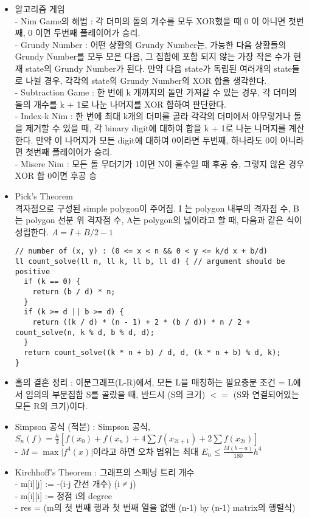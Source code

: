 \documentclass[landscape, 8pt, a4paper, oneside]{extarticle} %
\begin{document}
\begin{multicols*}{3}
\begin{itemize}
\item 알고리즘 게임\\
- Nim Game의 해법 : 각 더미의 돌의 개수를 모두 XOR했을 때 0 이 아니면 첫번째, 0 이면 두번째 플레이어가 승리.\\
- Grundy Number : 어떤 상황의 Grundy Number는, 가능한 다음 상황들의 Grundy Number를 모두 모은 다음, 그 집합에 포함 되지 않는 가장 작은 수가 현재 state의 Grundy Number가 된다. 만약 다음 state가 독립된 여러개의 state들로 나뉠 경우, 각각의 state의 Grundy Number의 XOR 합을 생각한다.\\
- Subtraction Game : 한 번에 k 개까지의 돌만 가져갈 수 있는 경우, 각 더미의 돌의 개수를 k + 1로 나눈 나머지를 XOR 합하여 판단한다.\\
- Index-k Nim : 한 번에 최대 k개의 더미를 골라 각각의 더미에서 아무렇게나 돌을 제거할 수 있을 때, 각 binary digit에 대하여 합을 k + 1로 나눈 나머지를 계산한다. 만약 이 나머지가 모든 digit에 대하여 0이라면 두번째, 하나라도 0이 아니라면 첫번째 플레이어가 승리.\\
- Misere Nim : 모든 돌 무더기가 1이면 N이 홀수일 때 후공 승, 그렇지 않은 경우 XOR 합 0이면 후공 승

\item Pick’s Theorem\\
격자점으로 구성된 simple polygon이 주어짐. I 는 polygon 내부의 격자점 수, B 는 polygon 선분 위 격자점 수, A는 polygon의 넓이라고 할 때, 다음과 같은 식이 성립한다. $A=I+B/2-1$
\begin{verbatim}
// number of (x, y) : (0 <= x < n && 0 < y <= k/d x + b/d)
ll count_solve(ll n, ll k, ll b, ll d) { // argument should be positive
  if (k == 0) {
    return (b / d) * n;
  }
  if (k >= d || b >= d) {
    return ((k / d) * (n - 1) + 2 * (b / d)) * n / 2 + count_solve(n, k % d, b % d, d);
  }
  return count_solve((k * n + b) / d, d, (k * n + b) % d, k);
}
\end{verbatim}

\item 홀의 결혼 정리 : 이분그래프(L-R)에서, 모든 L을 매칭하는 필요충분 조건 = L에서 임의의 부분집합 S를 골랐을 때, 반드시 (S의 크기) $<=$ (S와 연결되어있는 모든 R의 크기)이다.

\item Simpson 공식 (적분) : Simpson 공식, $S_n(f) = \frac{h}{3}[f(x_0)+f(x_n)+ 4\sum f(x_{2i+1}) + 2\sum f(x_{2i})]$\\
- $M = \max \vert f^4(x) \vert$이라고 하면 오차 범위는 최대 $E_n \leq \frac{M(b-a)}{180}h^4$

\item Kirchhoff’s Theorem : 그래프의 스패닝 트리 개수\\
- m[i][j] :=  -(i-j 간선 개수) (i ≠ j)\\
- m[i][i] :=  정점 i의 degree\\
- res =  (m의 첫 번째 행과 첫 번째 열을 없앤 (n-1) by (n-1) matrix의 행렬식)


\end{itemize}
\end{multicols*}
\end{document}
